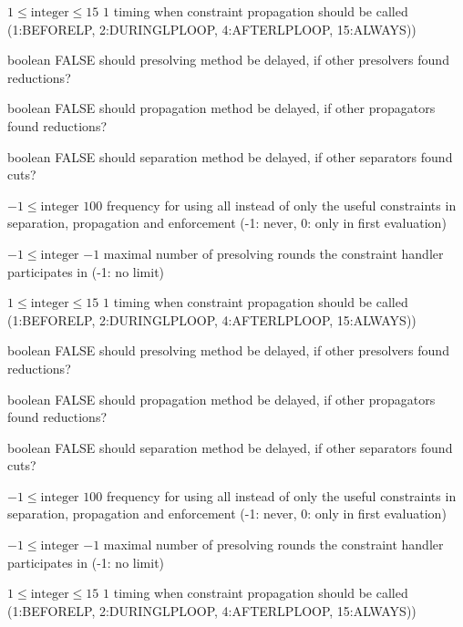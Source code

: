 %
{$1\leq\textrm{integer}\leq15$}%
{$1$}%
{timing when constraint propagation should be called (1:BEFORELP, 2:DURINGLPLOOP, 4:AFTERLPLOOP, 15:ALWAYS))}%
{}

%
{boolean}%
{FALSE}%
{should presolving method be delayed, if other presolvers found reductions?}%
{}

%
{boolean}%
{FALSE}%
{should propagation method be delayed, if other propagators found reductions?}%
{}

%
{boolean}%
{FALSE}%
{should separation method be delayed, if other separators found cuts?}%
{}

%
{$-1\leq\textrm{integer}$}%
{$100$}%
{frequency for using all instead of only the useful constraints in separation, propagation and enforcement (-1: never, 0: only in first evaluation)}%
{}

%
{$-1\leq\textrm{integer}$}%
{$-1$}%
{maximal number of presolving rounds the constraint handler participates in (-1: no limit)}%
{}

%
{$1\leq\textrm{integer}\leq15$}%
{$1$}%
{timing when constraint propagation should be called (1:BEFORELP, 2:DURINGLPLOOP, 4:AFTERLPLOOP, 15:ALWAYS))}%
{}

%
{boolean}%
{FALSE}%
{should presolving method be delayed, if other presolvers found reductions?}%
{}

%
{boolean}%
{FALSE}%
{should propagation method be delayed, if other propagators found reductions?}%
{}

%
{boolean}%
{FALSE}%
{should separation method be delayed, if other separators found cuts?}%
{}

%
{$-1\leq\textrm{integer}$}%
{$100$}%
{frequency for using all instead of only the useful constraints in separation, propagation and enforcement (-1: never, 0: only in first evaluation)}%
{}

%
{$-1\leq\textrm{integer}$}%
{$-1$}%
{maximal number of presolving rounds the constraint handler participates in (-1: no limit)}%
{}

%
{$1\leq\textrm{integer}\leq15$}%
{$1$}%
{timing when constraint propagation should be called (1:BEFORELP, 2:DURINGLPLOOP, 4:AFTERLPLOOP, 15:ALWAYS))}%
{}

